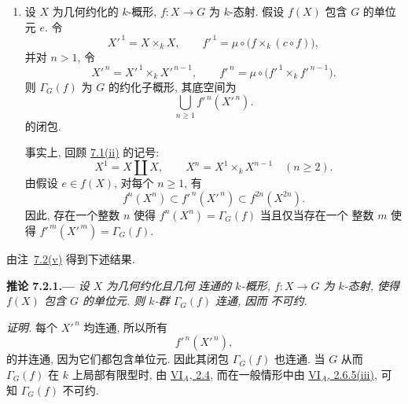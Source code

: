 \begin{enumerate}
\item[\textup{(v)}]\label{rem:sga3-VIB-7.2-v}
  设 \(X\) 为几何约化的 \(k\)-概形,
  \(f:X\to G\) 为 \(k\)-态射. 假设 \(f(X)\)
  包含 \(G\) 的单位元 \(e\). 令
  \[
    X'^{\,1}=X\times_kX,
    \qquad
    f'^{\,1}=\mu\circ\bigl(f\times_k(c\circ f)\bigr),
  \]
  并对 \(n>1\), 令
  \label{form:sga3-VIB-7.2-v-recursion}%
  \[
    X'^{\,n}=X'^{\,1}\times_kX'^{\,n-1},
    \qquad
    f'^{\,n}
      =\mu\circ\bigl(f'^{\,1}\times_k f'^{\,n-1}\bigr).
  \]
  则 \(\Gamma_G(f)\) 为 \(G\) 的约化子概形,
  其底空间为
  \[
    \bigcup_{n\geq1}f'^{\,n}(X'^{\,n}).
  \]
  的闭包.

  事实上, 回顾
  \hyperref[concl:sga3-VIB-7.1-ii]{7.1\textup{(ii)}} 的记号:
  \[
    X^1=X\amalg X,
    \qquad
    X^n=X^1\times_kX^{n-1}\quad(n\geq2).
  \]
  由假设 \(e\in f(X)\), 对每个 \(n\geq1\), 有
  \label{form:sga3-VIB-7.2-v-inclusions}%
  \[
    f^n(X^n)
      \subset f'^{\,n}(X'^{\,n})
      \subset f^{2n}(X^{2n}).
  \]
  因此, 存在一个整数 \(n\) 使得
  \(f^n(X^n)=\Gamma_G(f)\) 当且仅当存在一个
  整数 \(m\) 使得
  \(f'^{\,m}(X'^{\,m})=\Gamma_G(f)\).
\end{enumerate}

由注~\hyperref[rem:sga3-VIB-7.2-v]{7.2\textup{(v)}}
得到下述结果.

\medskip
{}\label{cor:sga3-VIB-7.2.1}%
\noindent\textbf{推论 7.2.1.---}
\emph{设 \(X\) 为几何约化且几何
连通的 \(k\)-概形, \(f:X\to G\) 为 \(k\)-态射,
使得 \(f(X)\) 包含 \(G\) 的单位元. 则
\(k\)-群 \(\Gamma_G(f)\) 连通, 因而
不可约.}

\emph{证明.}
每个 \(X'^{\,n}\) 均连通, 所以所有
\[
  f'^{\,n}(X'^{\,n}),
\]
的并连通, 因为它们都包含单位元. 因此其闭包
\(\Gamma_G(f)\) 也连通. 当 \(G\) 从而
\(\Gamma_G(f)\) 在 \(k\) 上局部有限型时,
由 \hyperref[prop:sga3-VIA-2.4]{VI\(_A\), 2.4},
而在一般情形中由
\hyperref[thm:sga3-VIA-2.6.5]{VI\(_A\), 2.6.5\textup{(iii)}},
可知 \(\Gamma_G(f)\) 不可约.


